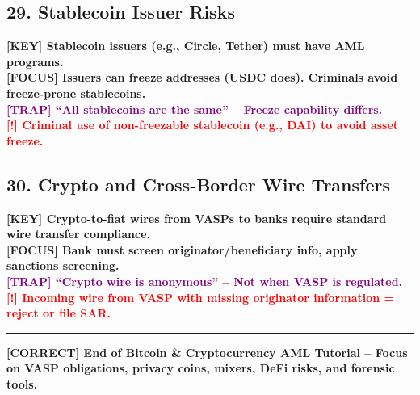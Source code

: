\documentclass[10pt,a4paper]{article}
\newcommand{\redflag}[1]{\textcolor{red}{\textbf{[!] #1}}}
\newcommand{\greennote}[1]{\textcolor{green!50!black}{\textbf{[CORRECT] #1}}}
\newcommand{\examfocus}[1]{\textcolor{orange!80!black}{\textbf{[FOCUS] #1}}}
\newcommand{\trap}[1]{\textcolor{purple}{\textbf{[TRAP] #1}}}
\newcommand{\keyterm}[1]{\textcolor{red!80!black}{\textbf{[KEY] #1}}}
\begin{document}
\subsection*{29. Stablecoin Issuer Risks}
\keyterm{Stablecoin issuers (e.g., Circle, Tether) must have AML programs.} \\
\examfocus{Issuers can freeze addresses (USDC does). Criminals avoid freeze-prone stablecoins.} \\
\trap{“All stablecoins are the same” – Freeze capability differs.} \\
\redflag{Criminal use of non-freezable stablecoin (e.g., DAI) to avoid asset freeze.}

\subsection*{30. Crypto and Cross-Border Wire Transfers}
\keyterm{Crypto-to-fiat wires from VASPs to banks require standard wire transfer compliance.} \\
\examfocus{Bank must screen originator/beneficiary info, apply sanctions screening.} \\
\trap{“Crypto wire is anonymous” – Not when VASP is regulated.} \\
\redflag{Incoming wire from VASP with missing originator information = reject or file SAR.}

\vspace{0.5cm}
\rule{\textwidth}{0.5pt}
\centering
\greennote{End of Bitcoin \& Cryptocurrency AML Tutorial – Focus on VASP obligations, privacy coins, mixers, DeFi risks, and forensic tools.}
\end{document}
